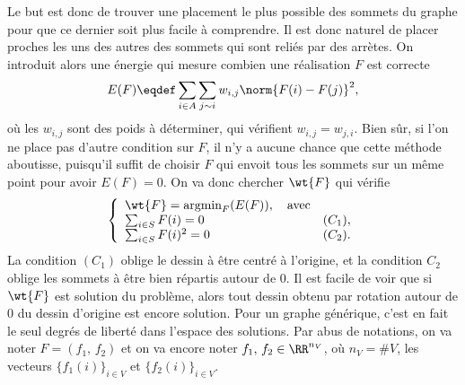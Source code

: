 \paraspace
Le but est donc de trouver une placement le plus  possible des sommets du graphe pour que ce dernier soit plus facile à comprendre. Il est donc naturel de placer proches les uns des autres des sommets qui sont reliés par des arrètes. On introduit alors une énergie qui mesure combien une réalisation $F$ est correcte
\begin{equation*}
E(F) \eqdef \sum_{i \in A}{ \sum_{j \sim i}{ w_{i,j} \norm{ F(i)-F(j) }^2 } },
\end{equation*}
où les $w_{i,j}$ sont des poids à déterminer, qui vérifient $w_{i,j} = w_{j,i}$. Bien sûr, si l'on ne place pas d'autre condition sur $F$, il n'y a aucune chance que cette méthode aboutisse, puisqu'il suffit de choisir $F$ qui envoit tous les sommets sur un même point pour avoir $E(F)=0$. On va donc chercher $\wt{F}$ qui vérifie
\begin{equation*}
\left\{ \begin{array}{ll} \wt{F} = \text{argmin}_{F}( E(F) ), \quad \text{avec} & \\ \sum_{i \in S}{F(i)}=0 & (C_1), \\ \sum_{i \in S}{F(i)^2}=0 & (C_2). \end{array} \right.
\end{equation*}
La condition $(C_1)$ oblige le dessin à être centré à l'origine, et la condition $C_2$ oblige les sommets à être bien répartis autour de $0$. Il est facile de voir que si $\wt{F}$ est solution du problème, alors tout dessin obtenu par rotation autour de $0$ du dessin d'origine est encore solution. Pour un graphe générique, c'est en fait le seul degrés de liberté dans l'espace des solutions. Par abus de notations, on va noter $F = (f_1,\,f_2)$ et on va encore noter $f_1,\,f_2 \in \RR^{n_V}$, où $n_V = \#V$, les vecteurs $\{f_1(i)\}_{i \in V}$ et $\{f_2(i)\}_{i \in V}$.

